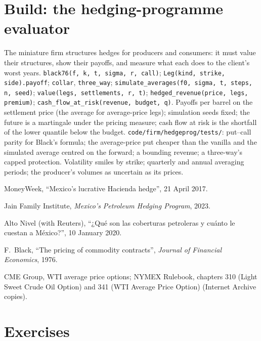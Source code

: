 \section{Build: the hedging-programme evaluator}\label{bld:m3:commodity-options-and-structured-hedges:hedgeprog}

\begin{build}
 The miniature firm structures hedges for producers and consumers: it must value their
structures, show their payoffs, and measure what each does to the client's worst years.
 \texttt{black76(f, k, t, sigma, r, call)}; \texttt{Leg(kind, strike, side).payoff};
\texttt{collar}, \texttt{three\_way}; \texttt{simulate\_averages(f0, sigma, t, steps, n, seed)};
\texttt{value(legs, settlements, r, t)}; \texttt{hedged\_revenue(price, legs, premium)};
\texttt{cash\_flow\_at\_risk(revenue, budget, q)}.
 Payoffs per barrel on the settlement price (the average for average-price legs); simulation
seeds fixed; the future is a martingale under the pricing measure; cash flow at risk is the shortfall of
the lower quantile below the budget.
 \texttt{code/firm/hedgeprog/tests/}: put--call parity for Black's formula; the
average-price put cheaper than the vanilla and the simulated average centred on the forward; a 
bounding revenue; a three-way's capped protection.
 Volatility smiles by strike; quarterly and annual averaging periods; the producer's
volumes as uncertain as its prices.
\end{build}

\begin{omsources}
\item MoneyWeek, ``Mexico's lucrative Hacienda hedge'', 21 April 2017.
\item Jain Family Institute, \emph{Mexico's Petroleum Hedging Program}, 2023.
\item Alto Nivel (with Reuters), ``¿Qué son las coberturas petroleras y cuánto le cuestan a México?'', 10 January 2020.
\item F.~Black, ``The pricing of commodity contracts'', \emph{Journal of Financial Economics}, 1976.
\item CME Group, WTI average price options; NYMEX Rulebook, chapters 310 (Light Sweet Crude Oil Option) and 341 (WTI Average
Price Option) (Internet Archive copies).
\end{omsources}

\section{Exercises}

